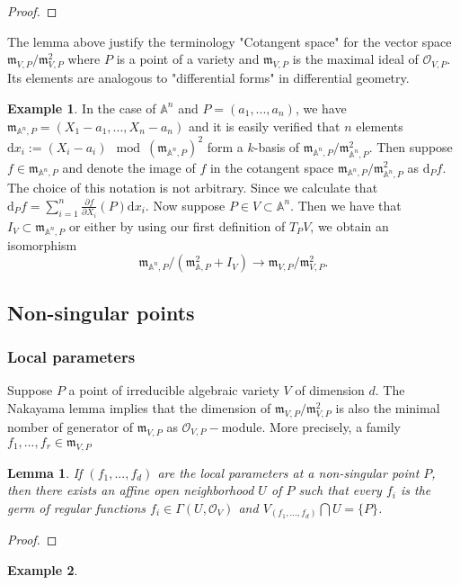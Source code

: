 \documentclass[12pt,a4paper,english]{article}
\theoremstyle{plain}
\newtheorem{lem}[thm]{Lemma}
\theoremstyle{definition}
\newtheorem*{example}{Example}
\theoremstyle{remark}
\newcommand{\dif}{\text{d}}
\begin{document}
\begin{tcolorbox}
\begin{proof}

\end{proof}
\end{tcolorbox}
The lemma above justify the terminology "Cotangent space" for the vector space $\mathfrak{m}_{V,P}/\mathfrak{m}_{V,P}^{2}$ where $P$ is a point of a variety and $\mathfrak{m}_{V,P}$ is the maximal ideal of $\mathcal{O}_{V,P}$. Its elements are analogous to "differential forms" in differential geometry.
\begin{example}
In the case of $\mathbb{A}^{n}$ and $P=(a_{1},...,a_{n})$, we have $\mathfrak{m}_{\mathbb{A}^{n},P}=(X_{1}-a_{1},...,X_{n}-a_{n})$ and it is easily verified that $n$ elements $\dif x_{i}:=(X_{i}-a_{i})\mod (\mathfrak{m}_{\mathbb{A}^{n},P})^{2}$ form a $k$-basis of $\mathfrak{m}_{\mathbb{A}^{n},P}/\mathfrak{m}_{\mathbb{A}^{n},P}^{2}$. Then suppose $f\in \mathfrak{m}_{\mathbb{A}^{n},P}$ and denote the image of $f$ in the cotangent space $\mathfrak{m}_{\mathbb{A}^{n},P}/\mathfrak{m}_{\mathbb{A}^{n},P}^{2}$ as $\dif_{P}f$. The choice of this notation is not arbitrary. Since we calculate that $\dif_{P}f=\sum^{n}_{i=1}\frac{\partial f}{\partial X_{i}}(P)\dif x_{i}$. Now suppose $P\in V\subset \mathbb{A}^{n}$. Then we have that $I_{V}\subset \mathfrak{m}_{\mathbb{A}^{n},P}$ or either by using our first definition of $T_{P}V$, we obtain an isomorphism \begin{equation*}
    \mathfrak{m}_{\mathbb{A}^{n},P}/(\mathfrak{m}^{2}_{\mathbb{A},P}+I_{V})\rightarrow \mathfrak{m}_{V,P}/\mathfrak{m}_{V,P}^{2}.
\end{equation*}       
\end{example}
\subsection{Non-singular points}
\subsubsection{Local parameters}
Suppose $P$ a point of irreducible algebraic variety $V$ of dimension $d$. The Nakayama lemma implies that the dimension of $\mathfrak{m}_{V,P}/\mathfrak{m}^{2}_{V,P}$ is also the minimal nomber of generator of $\mathfrak{m}_{V,P}$ as $\mathcal{O}_{V,P}-$module. More precisely, a family $f_{1},...,f_{r}\in\mathfrak{m}_{V,P}$   
\begin{lem}
If $(f_{1},...,f_{d})$
are the local parameters at a non-singular point 
$P$, then there exists an affine open neighborhood $U$ of $P$ such that every $f_{i}$ is the germ of regular functions $f_{i}\in \Gamma(U,\mathcal{O}_{V})$ and $V_{(f_{1},...,f_{d})}\bigcap U=\{P\}$.

\end{lem}
\begin{proof}

\end{proof}
\begin{example}

\end{example}
\end{document}
